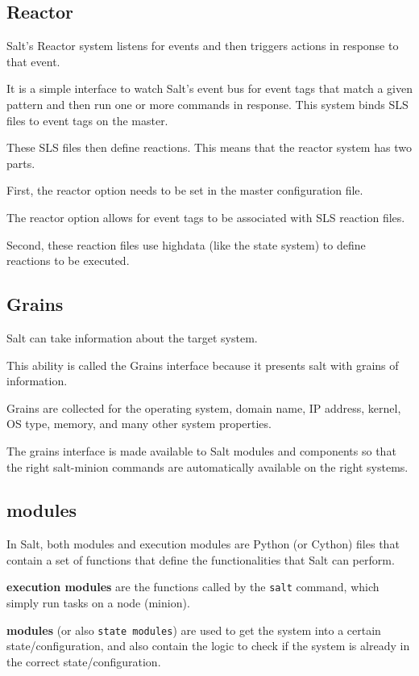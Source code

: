 \documentclass[12pt,a4paper,openright,twoside]{book}
\begin{document}
\subsection{Reactor}
Salt's Reactor system listens for events and then triggers actions in response to that event.

It is a simple interface to watch Salt's event bus for event tags that match a given pattern and then run one or more commands in response.
This system binds SLS files to event tags on the master.


These SLS files then define reactions. This means that the reactor system has two parts.


First, the reactor option needs to be set in the master configuration file.


The reactor option allows for event tags to be associated with SLS reaction files.


Second, these reaction files use highdata (like the state system) to define reactions to be executed.\cite{saltDocReactor}

\subsection{Grains}
Salt can take information about the target system.


This ability is called the Grains interface because it presents salt with grains of information.


Grains are collected for the operating system, domain name, IP address, kernel, OS type, memory, and many other system properties.


The grains interface is made available to Salt modules and components so that the right salt-minion commands are automatically available on the right systems.\cite{saltDocGrains}


\subsection{modules}
In Salt, both modules and execution modules are Python (or Cython) files that contain a set of functions that define the functionalities that Salt can perform.

\textbf{execution modules} are the functions called by the \texttt{salt} command, which simply run tasks on a node (minion).


\textbf{modules} (or also \texttt{state modules}) are used to get the system into a certain state/configuration, and also contain the logic to check if the system is already in the correct state/configuration.
\end{document}

